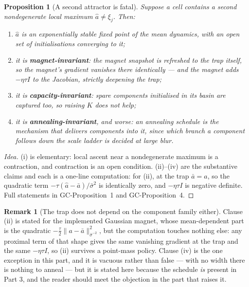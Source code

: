 \documentclass[11pt]{article}
\newtheorem{proposition}[theorem]{Proposition}
\theoremstyle{definition}
\newtheorem{remark}[theorem]{Remark}
\newcommand{\GC}[1]{\textsf{GC-#1}}
\begin{document}
\begin{proposition}[A second attractor is fatal]\label{prop:sharp}
Suppose a cell contains a second nondegenerate local maximum $\hat a \ne \xi_j$.
Then:
\begin{enumerate}
\item[(i)] $\hat a$ is an exponentially stable fixed point of the mean dynamics,
  with an \emph{open} set of initialisations converging to it;
\item[(ii)] it is \textbf{magnet-invariant}: the magnet snapshot is refreshed to
  the trap itself, so the magnet's gradient vanishes there identically --- and the
  magnet adds $-\eta\tau I$ to the Jacobian, strictly \emph{deepening} the trap;
\item[(iii)] it is \textbf{capacity-invariant}: spare components initialised in
  its basin are captured too, so raising $K$ does not help;
\item[(iv)] it is \textbf{annealing-invariant}, and worse: an annealing schedule
  is the mechanism that \emph{delivers} components into it, since which branch a
  component follows down the scale ladder is decided at large blur.
\end{enumerate}
\end{proposition}

\begin{proof}[Idea]
(i) is elementary: local ascent near a nondegenerate maximum is a contraction, and
contraction is an open condition. (ii)--(iv) are the substantive claims and each
is a one-line computation: for (ii), at the trap $\bar a = \hat a$, so the
quadratic term $-\tau(\hat a - \bar a)/\bar\sigma^2$ is identically zero, and
$-\eta\tau I$ is negative definite. Full statements in \GC{Proposition~1} and
\GC{Proposition~4}.
\end{proof}

\begin{remark}[The trap does not depend on the component family either]
\label{rem:trapfamily}
Clause (ii) is stated for the implemented Gaussian magnet, whose mean-dependent
part is the quadratic $-\tfrac{\tau}{2}\|a-\bar a\|^2_{\bar\sigma^{-2}}$, but the
computation touches nothing else: any proximal term of that shape gives the same
vanishing gradient at the trap and the same $-\eta\tau I$, so (ii) survives a
point-mass policy. Clause (iv) is the one exception in this part, and it is
vacuous rather than false --- with no width there is nothing to anneal --- but it
is stated here because the schedule \emph{is} present in Part 3, and the reader
should meet the objection in the part that raises it.
\end{remark}
\end{document}
